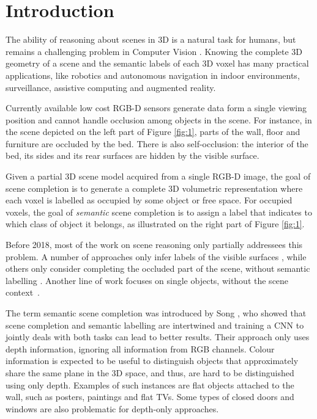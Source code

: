 
\section{Introduction}
The ability of reasoning about scenes in 3D is a natural task
for humans, but remains a challenging problem in Computer Vision \cite{marr_vision:_1982}. 
Knowing the complete 3D geometry of a scene and the semantic labels of each 3D voxel has 
many practical applications,
like  robotics and autonomous navigation in indoor environments,  surveillance,  
assistive  computing and augmented reality. 

Currently available  low  cost  RGB-D  sensors generate data form a single viewing position
and cannot handle occlusion among objects in the scene. 
For instance, in the scene depicted on the left part of Figure \ref{fig:1}, parts of
the wall, floor and furniture are occluded by the bed.
There is also self-occlusion: the interior of the bed, its sides and
its rear surfaces are hidden by the visible surface.

Given a partial 3D scene model acquired from a single RGB-D image, the goal of scene completion is to generate a complete 3D 
volumetric representation where each voxel is labelled as
occupied by some object or free space. 
For occupied voxels, the goal of {\em semantic} scene completion
is to assign a label that indicates to which class of object
it belongs, as illustrated on the right part of Figure \ref{fig:1}. 

Before 2018, most of the work on scene reasoning only partially addressees this problem. A number of approaches only infer labels of the visible surfaces \cite{Gupta_2013,Qi_2017,ren_2012}, while others only
consider completing the occluded part of the scene, without semantic
labelling \cite{firman_2016}. Another line of work focuses on single
objects, without the scene context~\cite{Nguyen_2016}.

The term semantic scene completion was introduced by Song \etal \cite{song_semantic_2017},
who showed that scene completion and semantic labelling are intertwined and training a CNN to jointly deals with both tasks can lead to better results. 
Their approach only uses depth information, ignoring all information from RGB channels. 
Colour information is expected to be
useful to distinguish objects that approximately share the same plane in the 3D space, and thus, are hard to be distinguished using only depth.
Examples of such instances are flat objects attached to the wall, such as posters, paintings and flat TVs. Some types of closed doors and windows are also problematic for depth-only approaches.

